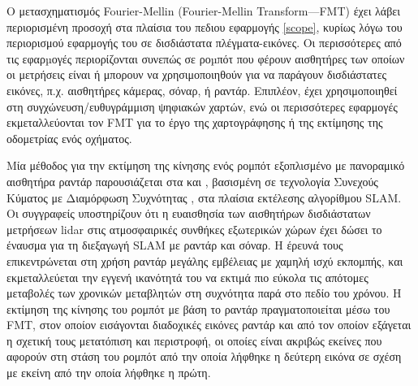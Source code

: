 Ο μετασχηματισμός Fourier-Mellin (Fourier-Mellin Transform---FMT) έχει λάβει
περιορισμένη προσοχή στα πλαίσια του πεδιου εφαρμογής \ref{scope}, κυρίως λόγω
του περιορισμού εφαρμογής του σε δισδιάστατα πλέγματα-εικόνες. Οι περισσότερες
από τις εφαρµογές περιορίζονται συνεπώς σε ροµπότ που φέρουν αισθητήρες των
οποίων οι μετρήσεις είναι ή μπορουν να χρησιμοποιηθούν για να παράγουν
δισδιάστατες εικόνες, π.χ. αισθητήρες κάμερας, σόναρ, ή ραντάρ.  Επιπλέον, έχει
χρησιμοποιηθεί στη συγχώνευση/ευθυγράμμιση ψηφιακών χαρτών, ενώ οι περισσότερες
εφαρμογές εκμεταλλεύονται τον FMT για το έργο της χαρτογράφησης ή της εκτίμησης
της οδομετρίας ενός οχήματος.

Μία μέθοδος για την εκτίμηση της κίνησης ενός ρομπότ εξοπλισμένο με πανοραμικό
αισθητήρα ραντάρ παρουσιάζεται στα \cite{Checchin2010} και \cite{Vivet2013},
βασισμένη σε τεχνολογία Συνεχούς Κύματος με Διαμόρφωση Συχνότητας
\cite{Monod1995}, στα πλαίσια εκτέλεσης αλγορίθμου SLAM. Οι συγγραφείς
υποστηρίζουν ότι η ευαισθησία των αισθητήρων δισδιάστατων μετρήσεων lidar στις
ατμοσφαιρικές συνθήκες εξωτερικών χώρων έχει δώσει το έναυσμα για τη διεξαγωγή
SLAM με ραντάρ και σόναρ. Η έρευνά τους επικεντρώνεται στη χρήση ραντάρ μεγάλης
εμβέλειας με χαμηλή ισχύ εκπομπής, και εκμεταλλεύεται την εγγενή ικανότητά του
να εκτιμά πιο εύκολα τις απότομες μεταβολές των χρονικών μεταβλητών στη
συχνότητα παρά στο πεδίο του χρόνου. Η εκτίμηση της κίνησης του ρομπότ με βάση
το ραντάρ πραγματοποιείται μέσω του FMT, στον οποίον εισάγονται διαδοχικές
εικόνες ραντάρ και από τον οποίον εξάγεται η σχετική τους μετατόπιση και
περιστροφή, οι οποίες είναι ακριβώς εκείνες που αφορούν στη στάση του ρομπότ
από την οποία λήφθηκε η δεύτερη εικόνα σε σχέση με εκείνη από την οποία λήφθηκε
η πρώτη.

